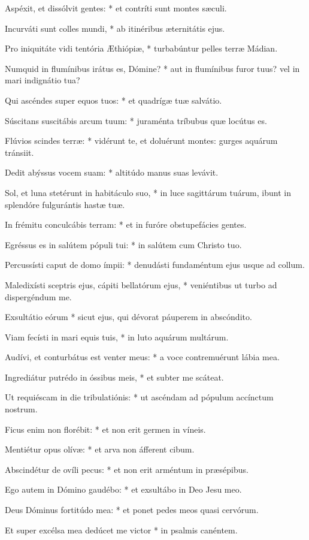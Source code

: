 Aspéxit, et dissólvit gentes: * et contríti sunt montes sæculi.

Incurváti sunt colles mundi, * ab itinéribus æternitátis ejus.

Pro iniquitáte vidi tentória Æthiópiæ, * turbabúntur pelles terræ Mádian.

Numquid in flumínibus irátus es, Dómine? * aut in flumínibus furor tuus? vel in mari indignátio tua?

Qui ascéndes super equos tuos: * et quadrígæ tuæ salvátio.

Súscitans suscitábis arcum tuum: * juraménta tríbubus quæ locútus es.

Flúvios scindes terræ: * vidérunt te, et doluérunt montes: gurges aquárum tránsiit.

Dedit abýssus vocem suam: * altitúdo manus suas levávit.

Sol, et luna stetérunt in habitáculo suo, * in luce sagittárum tuárum, ibunt in splendóre fulgurántis hastæ tuæ.

In frémitu conculcábis terram: * et in furóre obstupefácies gentes.

Egréssus es in salútem pópuli tui: * in salútem cum Christo tuo.

Percussísti caput de domo ímpii: * denudásti fundaméntum ejus usque ad collum.

Maledixísti sceptris ejus, cápiti bellatórum ejus, * veniéntibus ut turbo ad dispergéndum me.

Exsultátio eórum * sicut ejus, qui dévorat páuperem in abscóndito.

Viam fecísti in mari equis tuis, * in luto aquárum multárum.

Audívi, et conturbátus est venter meus: * a voce contremuérunt lábia mea.

Ingrediátur putrédo in óssibus meis, * et subter me scáteat.

Ut requiéscam in die tribulatiónis: * ut ascéndam ad pópulum accínctum nostrum.

Ficus enim non florébit: * et non erit germen in víneis.

Mentiétur opus olívæ: * et arva non áfferent cibum.

Abscindétur de ovíli pecus: * et non erit arméntum in præsépibus.

Ego autem in Dómino gaudébo: * et exsultábo in Deo Jesu meo.

Deus Dóminus fortitúdo mea: * et ponet pedes meos quasi cervórum.

Et super excélsa mea dedúcet me victor * in psalmis canéntem.

